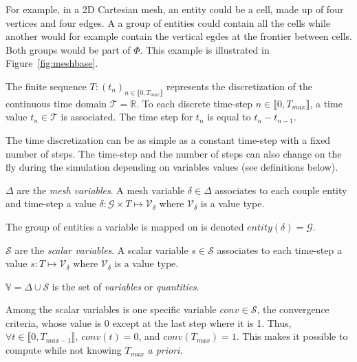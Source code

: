 For example, in a 2D Cartesian mesh, an entity could be a cell, made up of four vertices and four edges.
A a group of entities could contain all the cells while another would for example contain the vertical egdes at the frontier between cells.
Both groups would be part of $\Phi$.
This example is illustrated in Figure~\ref{fig:meshbase}.

\medskip

\begin{mydef}
The finite sequence $T: (t_n)_{n\in\llbracket 0, T_{max} \rrbracket}$ represents the discretization of the continuous time domain $\mathcal{T}=\mathbb{R}$.
To each discrete time-step $n\in\llbracket 0, T_{max} \rrbracket$, a time value $t_n\in\mathcal{T}$ is associated. The time step for $t_n$ is equal to $t_n-t_{n-1}$.
\end{mydef}

The time discretization can be as simple as a constant time-step with a fixed number of steps.
The time-step and the number of steps can also change on the fly during the simulation depending on variables values (see definitions below).

\medskip

\begin{mydefs}
\item $\Delta$ are the \textit{mesh variables}. A mesh variable $\delta \in \Delta$ associates to each couple entity and time-step a value $\delta: \mathcal{G}\times T\mapsto \mathcal{V}_\delta$ where $\mathcal{V}_{\delta}$ is a value type.
\item The group of entities a variable is mapped on is denoted $entity(\delta)=\mathcal{G}$.
\item $\mathcal{S}$ are the \textit{scalar variables}. A scalar variable $s \in \mathcal{S}$ associates to each time-step a value $s: T\mapsto \mathcal{V}_\delta$ where $\mathcal{V}_{\delta}$ is a value type.
\item $\mathbb{V}=\Delta\cup\mathcal{S}$ is the set of \emph{variables} or \emph{quantities}.
\item Among the scalar variables is one specific variable $conv\in\mathcal{S}$, the convergence criteria, whose value is $0$ except at the last step where it is 1. Thus, $\forall t\in \llbracket 0, T_{max-1} \rrbracket$, $conv(t)=0$, and $conv(T_{max})=1$. This makes it possible to compute while not knowing $T_{max}$ \textit{a priori}.
\end{mydefs}

